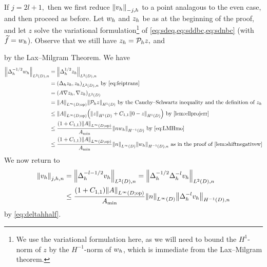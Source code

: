 If $j=2l+1,$ then we first reduce $\Nfn{-j,h}{\vh}$ to a point analagous to the even case, and then proceed as before. Let $w_{h}$ and $z_{h}$ be as at the beginning of the proof, and let $z$ solve the variational formulation\footnote{We use the variational formulation here, as we will need to bound the $H^1$-norm of $z$ by the $H^{-1}$-norm of $w_{h}$, which is immediate from the Lax--Milgram theorem.}  of \cref{eq:sdeq,eq:sddbc,eq:sdnbc} (with $\widetilde{f} = w_{h}$). Observe that we still have $z_{h} = \mathcal P_{h} z,$ and

\beq\label{eq:LMHmo}
 \leq {} 
\eeq
by the Lax--Milgram Theorem. We have
\begin{align}
\NLtDn{\Deltah^{-1/2}\wh} &= \NLtDn{\Deltah^{1/2} \zh}\nonumber\\
&= \IPLtDn{\Deltah \zh}{\zh} \text{ by \cref{eq:feiptrans}}\\
&= \IPLtD{A \grad \zh}{\grad \zh}\nonumber\\
&= \NLiDop{A} \NHoD{\Ph z}\nonumber\text{ by the Cauchy--Schwartz inequality and the definition of } \zh\\
&\leq \NLiDop{A}\mleft(\NHoD{z} + \Cfn{1,1}\NHoD{0 - z}\mright) \text{ by \cref{lem:ellprojerr}}\nonumber\\
&\leq \frac{\mleft(1+\Cfn{1,1}\mright)\NLiDop{A}}{\Amin}  \NHmoD{n\wh}\text{ by \cref{eq:LMHmo}}\label{eq:deltahhalf}\\
&\leq \frac{\mleft(1+\Cfn{1,1}\mright)\NLiDop{A}}{\Amin}\NLiD{n}  \NHnfn{-1}{D}{\wh}\text{ as in the proof of \cref{lem:shiftnegativew}}\nonumber
\end{align}
We now return to
\begin{align*}
\Nfn{j,h,n}{\vh} &= \NLtDn{\Deltah^{-l-1/2} \vh} = \NLtDn{\Deltah^{-1/2} \Deltah^{-l} \vh}\\
&\leq \frac{\mleft(1+\Cfn{1,1}\mright)\NLiDop{A}}{\Amin}\NLiD{n}\NHnfn{-1}{D}{\Deltah^{-l}\vh}
\end{align*}
by \cref{eq:deltahhalf}.


